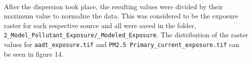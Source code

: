 \documentclass[article,12pt]{article}
\numberwithin{equation}{section}
\begin{document}
\begin{adjustwidth}{-.88in}{-.88in}
	\begin{center}
		\\
		
	\end{center}
\end{adjustwidth}
\vspace{.5in}

After the dispersion took place, the resulting values were divided by their maximum value to normalize the data. This was considered to be the exposure raster for each respective source and all were saved in the folder, \texttt{2\_Model\_Pollutant\_Exposure/\_Modeled\_Exposure}. The distribution of the raster values for \texttt{aadt\_exposure.tif} and \newline \texttt{PM2.5 Primary\_current\_exposure.tif} can be seen in figure 14. 

\vspace{.5in}
\begin{adjustwidth}{-.88in}{-.88in}
\begin{center}
	\\
	
\end{center}
\end{adjustwidth}
\end{document}
